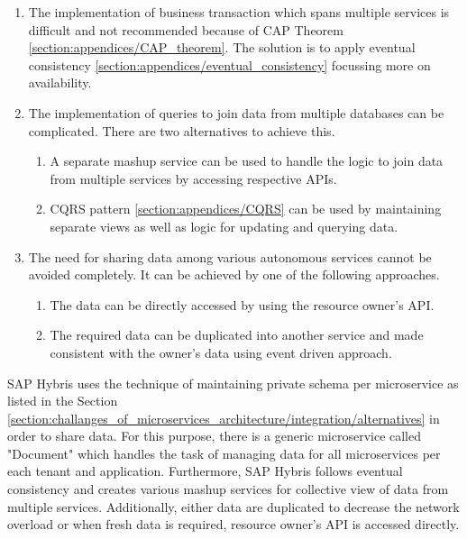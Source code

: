 \begin{enumerate}
\item The implementation of business transaction which spans multiple services is difficult and not recommended because of \acrshort{CAP} Theorem \ref{section:appendices/CAP_theorem}. The solution is to apply eventual consistency \ref{section:appendices/eventual_consistency} focussing more on availability.
\item The implementation of queries to join data from multiple databases can be complicated. There are two alternatives to achieve this.
    \begin{enumerate}
        \item A separate mashup service can be used to handle the logic to join data from multiple services by accessing respective \acrshort{API}s.
        \item \acrshort{CQRS} pattern \ref{section:appendices/CQRS} can be used by maintaining separate views as well as logic for updating and querying data.
    \end{enumerate}
\item The need for sharing data among various autonomous services cannot be avoided completely. It can be achieved by one of the following approaches.
    \begin{enumerate}
        \item The data can be directly accessed by using the resource owner's \acrshort{API}.
        \item The required data can be duplicated into another service and made consistent with the owner's data using event driven approach.
    \end{enumerate}
\end{enumerate}
\begin{shaded}
SAP Hybris uses the technique of maintaining private schema per microservice as listed in the Section \ref{section:challanges_of_microservices_architecture/integration/alternatives} in order to share data. For this purpose, there is a generic microservice called "Document" which handles the task of managing data for all microservices per each tenant and application. Furthermore, SAP Hybris follows eventual consistency and creates various mashup services for collective view of data from multiple services. Additionally, either data are duplicated to decrease the network overload or when fresh data is required, resource owner's \acrshort{API} is accessed directly.
\end{shaded}

